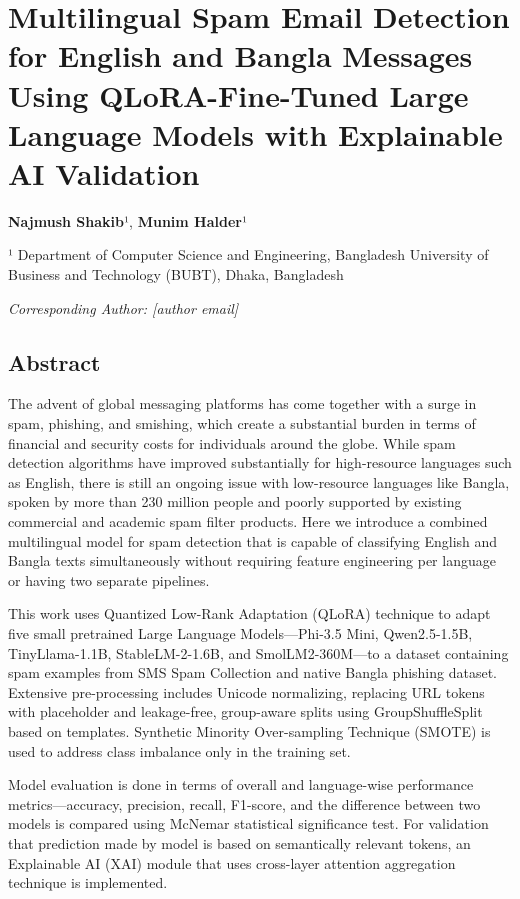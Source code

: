 \section{Multilingual Spam Email Detection for English and Bangla
Messages Using QLoRA-Fine-Tuned Large Language Models with Explainable
AI
Validation}\label{multilingual-spam-email-detection-for-english-and-bangla-messages-using-qlora-fine-tuned-large-language-models-with-explainable-ai-validation}

\textbf{Najmush Shakib}¹, \textbf{Munim Halder}¹

¹ Department of Computer Science and Engineering, Bangladesh University
of Business and Technology (BUBT), Dhaka, Bangladesh

\emph{Corresponding Author: {[}author email{]}}

\subsection{Abstract}\label{abstract}

The advent of global messaging platforms has come together with a surge
in spam, phishing, and smishing, which create a substantial burden in
terms of financial and security costs for individuals around the globe.
While spam detection algorithms have improved substantially for
high-resource languages such as English, there is still an ongoing issue
with low-resource languages like Bangla, spoken by more than 230 million
people and poorly supported by existing commercial and academic spam
filter products. Here we introduce a combined multilingual model for
spam detection that is capable of classifying English and Bangla texts
simultaneously without requiring feature engineering per language or
having two separate pipelines.

This work uses Quantized Low-Rank Adaptation (QLoRA) technique to adapt
five small pretrained Large Language Models---Phi-3.5 Mini,
Qwen2.5-1.5B, TinyLlama-1.1B, StableLM-2-1.6B, and SmolLM2-360M---to a
dataset containing spam examples from SMS Spam Collection and native
Bangla phishing dataset. Extensive pre-processing includes Unicode
normalizing, replacing URL tokens with placeholder and leakage-free,
group-aware splits using GroupShuffleSplit based on templates. Synthetic
Minority Over-sampling Technique (SMOTE) is used to address class
imbalance only in the training set.

Model evaluation is done in terms of overall and language-wise
performance metrics---accuracy, precision, recall, F1-score, and the
difference between two models is compared using McNemar statistical
significance test. For validation that prediction made by model is based
on semantically relevant tokens, an Explainable AI (XAI) module that
uses cross-layer attention aggregation technique is implemented.


